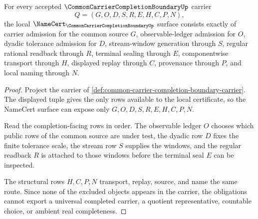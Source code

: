 \begin{theorem}
\label{thm:common-carrier-completion-boundary-namecert-obligations}
For every accepted $\CommonCarrierCompletionBoundaryUp$ carrier
$$
Q=(G,O,D,S,R,E,H,C,P,N),
$$
the local $\NameCert_{\CommonCarrierCompletionBoundaryUp}$ surface consists exactly of carrier admission for the common source $G$, observable-ledger admission for $O$, dyadic tolerance admission for $D$, stream-window generation through $S$, regular rational readback through $R$, terminal sealing through $E$, componentwise transport through $H$, displayed replay through $C$, provenance through $P$, and local naming through $N$.
\end{theorem}
\begin{proof}
Project the carrier of \autoref{def:common-carrier-completion-boundary-carrier}. The displayed tuple gives the only rows available to the local certificate, so the NameCert surface can expose only $G,O,D,S,R,E,H,C,P,N$.

Read the completion-facing rows in order. The observable ledger $O$ chooses which public rows of the common source are under test, the dyadic row $D$ fixes the finite tolerance scale, the stream row $S$ supplies the windows, and the regular readback $R$ is attached to those windows before the terminal seal $E$ can be inspected.

The structural rows $H,C,P,N$ transport, replay, source, and name the same route. Since none of the excluded objects appears in the carrier, the obligations cannot export a universal completed carrier, a quotient representative, countable choice, or ambient real completeness.
\end{proof}

